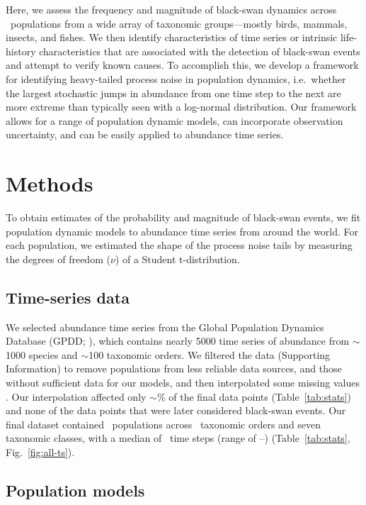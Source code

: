 Here, we assess the frequency and magnitude of black-swan dynamics across
\NPops\ populations from a wide array of taxonomic groups---mostly birds,
mammals, insects, and fishes. We then identify characteristics of time series
or intrinsic life-history characteristics that are associated with the
detection of black-swan events and attempt to verify known causes. To
accomplish this, we develop a framework for identifying heavy-tailed process
noise in population dynamics, i.e.\ whether the largest stochastic jumps in
abundance from one time step to the next are more extreme than typically seen
with a log-normal distribution. Our framework allows for a range of population
dynamic models, can incorporate observation uncertainty, and can be easily
applied to abundance time series.

\section{Methods}

To obtain estimates of the probability and magnitude of black-swan events, we
fit population dynamic models to abundance time series from around the world.
For each population, we estimated the shape of the process noise tails by
measuring the degrees of freedom ($\nu$) of a Student t-distribution.

\subsection{Time-series data}

We selected abundance time series from the Global Population Dynamics Database
(GPDD; \citeauthor{gpdd2010} \citeyear{gpdd2010}), which contains nearly 5000
time series of abundance from $\sim$1000 species and $\sim$100 taxonomic
orders. We filtered the data (Supporting Information) to remove populations
from less reliable data sources, and those without sufficient data for our
models, and then interpolated some missing values
\citep[\textit{sensu}][]{brook2006a}. Our interpolation affected only
$\sim$\interpPointsPerc \% of the final data points (Table~\ref{tab:stats})
and none of the data points that were later considered black-swan events. Our
final dataset contained \NPops~populations across \NOrders~taxonomic orders
and seven taxonomic classes, with a median of \medianTimeSteps~time steps
(range of \minTimeSteps--\maxTimeSteps) (Table~\ref{tab:stats},
Fig.~\ref{fig:all-ts}).

\subsection{Population models}

